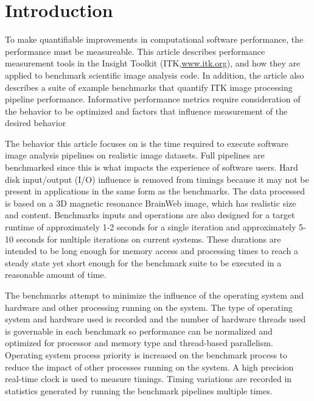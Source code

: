 \documentclass{InsightArticle}
\newcommand{\IJhandlerIDnumber}{1338}
\begin{document}
\IJhandlenote{\IJhandlerIDnumber}

\tableofcontents

\section{Introduction}

To make quantifiable improvements in computational software performance, the
performance must be measureable. This article describes performance
measurement tools in the Insight Toolkit (ITK,\url{www.itk.org}), and how they
are applied to benchmark scientific image analysis code. In addition, the
article also describes a suite of example benchmarks that quantify ITK image
processing pipeline performance. Informative performance metrics require
consideration of the behavior to be optimized and factors that influence
measurement of the desired behavior

The behavior this article focuses on is the time required to execute software
image analysis pipelines on realistic image datasets. Full pipelines are
benchmarked since this is what impacts the experience of software users. Hard
disk input/output (I/O) influence is removed from timings because it may not
be present in applications in the same form as the benchmarks. The data
processed is based on a 3D magnetic resonance
BrainWeb\cite{BrainWeb1,BrainWeb2} image, which has realistic size and
content. Benchmarks inputs and operations are also designed for a target
runtime of approximately 1-2 seconds for a single iteration and approximately
5-10 seconds for multiple iterations on current systems. These durations are
intended to be long enough for memory access and processing times to reach a
steady state yet short enough for the benchmark suite to be executed in a
reasonable amount of time.

The benchmarks attempt to minimize the influence of the operating system and
hardware and other processing running on the system. The type of operating
system and hardware used is recorded and the number of hardware threads used
is governable in each benchmark so performance can be normalized and optimized
for processor and memory type and thread-based parallelism. Operating system
process priority is increased on the benchmark process to reduce the impact of
other processes running on the system. A high precision real-time clock is
used to measure timings.  Timing variations are recorded in statistics
generated by running the benchmark pipelines multiple times.
\end{document}
